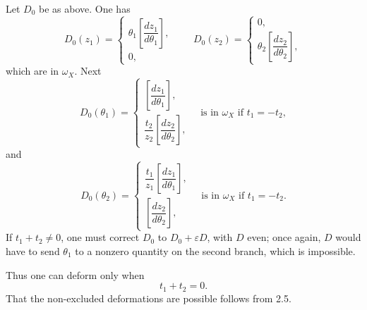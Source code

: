 \documentclass[11pt]{article}
\begin{document}
Let $D_0$ be as above. One has
\[
D_0(z_1)=
\begin{cases}
\theta_1\left[\dfrac{dz_1}{d\theta_1}\right],\\
0,
\end{cases}
\qquad
D_0(z_2)=
\begin{cases}
0,\\
\theta_2\left[\dfrac{dz_2}{d\theta_2}\right],
\end{cases}
\]
which are in $\omega_X$. Next
\[
D_0(\theta_1)=
\begin{cases}
\left[\dfrac{dz_1}{d\theta_1}\right],\\[2mm]
\dfrac{t_2}{z_2}\left[\dfrac{dz_2}{d\theta_2}\right],
\end{cases}
\quad\text{is in }\omega_X\text{ if }t_1=-t_2,
\]
and
\[
D_0(\theta_2)=
\begin{cases}
\dfrac{t_1}{z_1}\left[\dfrac{dz_1}{d\theta_1}\right],\\[2mm]
\left[\dfrac{dz_2}{d\theta_2}\right],
\end{cases}
\quad\text{is in }\omega_X\text{ if }t_1=-t_2.
\]
If $t_1+t_2\ne0$, one must correct $D_0$ to $D_0+\varepsilon D$, with $D$ even; once again, $D$ would have to send $\theta_1$ to a nonzero quantity on the second branch, which is impossible.

Thus one can deform only when
\[
  t_1+t_2=0.
\]
That the non-excluded deformations are possible follows from 2.5.
\end{document}

